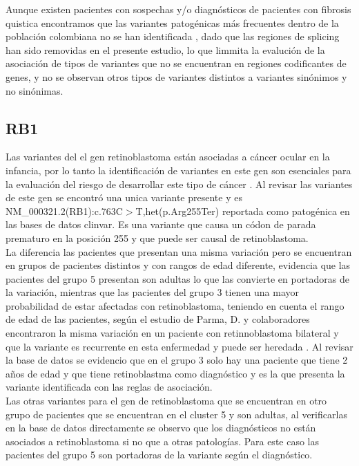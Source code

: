 Aunque existen pacientes con sospechas y/o diagnósticos de pacientes con fibrosis quistica encontramos que las variantes patogénicas más frecuentes dentro de la población colombiana no se han identificada \cite{Vasquez2010}, dado que las regiones de splicing han sido removidas en el presente estudio, lo que limmita la evalución de la asociación de tipos de variantes que no se encuentran en regiones codificantes de genes, y no se observan otros tipos de variantes distintos a variantes sinónimos y no sinónimas. 


\subsection*{RB1}

Las variantes del el gen retinoblastoma están asociadas a cáncer ocular en la infancia, por lo tanto la identificación de variantes en este gen son esenciales para la evaluación del riesgo de desarrollar este tipo de cáncer \cite{Parma2017}. Al revisar las variantes de este gen se encontró una unica variante presente   y es NM\_000321.2(RB1):c.763C$>$T,het(p.Arg255Ter) reportada como patogénica en las bases de datos clinvar. Es una variante que causa un códon de parada prematuro en la posición 255 y que puede ser causal de retinoblastoma. \\  

La diferencia  las pacientes que presentan una misma variación pero se encuentran en grupos de pacientes distintos y con rangos de edad diferente, evidencia que las pacientes del grupo 5 presentan son adultas lo que las convierte en portadoras de la variación, mientras que las pacientes del grupo 3 tienen una mayor probabilidad de estar afectadas con retinoblastoma, teniendo en cuenta el rango de edad de las pacientes, según el estudio de Parma, D. y colaboradores encontraron la misma variación en un paciente con retinnoblastoma bilateral y que la variante es recurrente en esta enfermedad y puede ser heredada \cite{Parma2017}. Al revisar la base de datos se evidencio que en el grupo 3 solo hay una paciente que tiene 2 años de edad y que tiene retinoblastma como diagnóstico y es la que presenta la variante identificada con las reglas de asociación. \\

Las otras variantes para el gen de retinoblastoma que se encuentran en otro grupo de pacientes  que se encuentran en el cluster 5 y son adultas, al verificarlas en la base de datos directamente se observo que los diagnósticos no están asociados a retinoblastoma si no que a otras patologías. Para este caso las pacientes del grupo 5 son portadoras de la variante según el diagnóstico.\\ 

